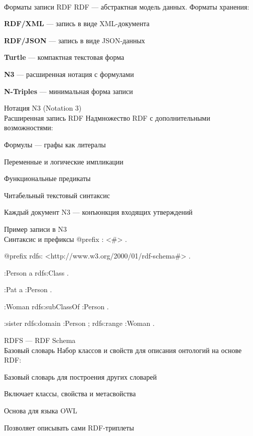 \begin{frame}{\\Форматы записи RDF}
	\topline
	\justifying
	RDF --- абстрактная модель данных. Форматы хранения:
	\begin{textitemize}
		\item \textbf{RDF/XML} --- запись в виде XML-документа
		\item \textbf{RDF/JSON} --- запись в виде JSON-данных
		\item \textbf{Turtle} --- компактная текстовая форма
		\item \textbf{N3} --- расширенная нотация с формулами
		\item \textbf{N-Triples} --- минимальная форма записи
	\end{textitemize}
\end{frame}

\begin{frame}{Нотация N3 (Notation 3)\\Расширенная запись RDF}
	\topline
	\justifying
	Надмножество RDF с дополнительными возможностями:
	\begin{textitemize}
		\item Формулы --- графы как литералы
		\item Переменные и логические импликации
		\item Функциональные предикаты
		\item Читабельный текстовый синтаксис
	\end{textitemize}
	
	Каждый документ N3 --- конъюнкция входящих утверждений
\end{frame}

\begin{frame}{Пример записи в N3\\Синтаксис и префиксы}
	\topline
	\justifying
	@prefix : <\#> .
	
	@prefix rdfs: <http://www.w3.org/2000/01/rdf-schema\#> .
	
	\vspace{0.3cm}
	:Person a rdfs:Class .
	
	:Pat a :Person .
	
	:Woman rdfs:subClassOf :Person .
	
	:sister rdfs:domain :Person ; rdfs:range :Woman .
\end{frame}

\begin{frame}{RDFS --- RDF Schema\\Базовый словарь}
	\topline
	\justifying
	Набор классов и свойств для описания онтологий на основе RDF:
	\begin{textitemize}
		\item Базовый словарь для построения других словарей
		\item Включает классы, свойства и метасвойства
		\item Основа для языка OWL
		\item Позволяет описывать сами RDF-триплеты
	\end{textitemize}
\end{frame}

